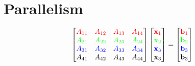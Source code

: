 \documentclass[12pt]{article}
\let\vec\mathbf
\begin{document}
\section{Parallelism}
$$
\begin{bmatrix}
	{\color{red} A_{11} } & {\color{red} A_{12} } & {\color{red} A_{13} } & {\color{red} A_{14} }\\
	{\color{green} A_{21} } & {\color{green} A_{22} } & {\color{green} A_{23} } & {\color{green} A_{24} } \\
	{\color{blue} A_{31} } & {\color{blue} A_{32} } & {\color{blue} A_{33} } & {\color{blue} A_{34} } \\
	{\color{black} A_{41} } & {\color{black} A_{42} } & {\color{black} A_{43} } & {\color{black} A_{44} } \\
\end{bmatrix}
\begin{bmatrix}
	{\color{red} \vec{x}_{1} } \\
	{\color{green} \vec{x}_{2} } \\
	{\color{blue} \vec{x}_{3} } \\
	{\color{black} \vec{x}_{3} } 
\end{bmatrix}
=
\begin{bmatrix}
	{\color{red} \vec{b}_{1} } \\
	{\color{green} \vec{b}_{2} } \\
	{\color{blue} \vec{b}_{3} } \\
	{\color{black} \vec{b}_{3} }
\end{bmatrix}
$$
\end{document}
